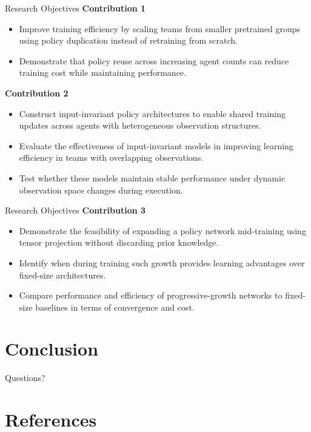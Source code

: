 \documentclass[xcolor={svgnames},aspectratio=169]{beamer}
\begin{document}
\begin{frame}{Research Objectives}
    \textbf{Contribution 1}
    \begin{itemize}
        \item {Improve training efficiency by scaling teams from smaller pretrained groups 
            using policy duplication instead of retraining from scratch.}
        \item {Demonstrate that policy reuse across increasing agent counts can reduce 
            training cost while maintaining performance.}
    \end{itemize}
    \vspace{1em}
    \textbf{Contribution 2}
    \begin{itemize}
        \item {Construct input-invariant policy architectures to enable shared training 
            updates across agents with heterogeneous observation structures.}
        \item {Evaluate the effectiveness of input-invariant models in improving learning 
            efficiency in teams with overlapping observations.}
        \item {Test whether these models maintain stable performance under dynamic 
            observation space changes during execution.}
    \end{itemize}
\end{frame}

\begin{frame}{Research Objectives}
    \textbf{Contribution 3}
    \begin{itemize}
        \item {Demonstrate the feasibility of expanding a policy network mid-training 
            using tensor projection without discarding prior knowledge.}
        \item {Identify when during training such growth provides learning advantages 
            over fixed-size architectures.}
        \item {Compare performance and efficiency of progressive-growth networks to 
            fixed-size baselines in terms of convergence and cost.}
    \end{itemize}
\end{frame}







\section{Conclusion}

\begin{frame}
    \centering
    \Huge
    Questions?
\end{frame}

\section{References}

\renewcommand*{\bibfont}{\tiny}
\frame[allowframebreaks]{\printbibliography}
\end{document}
